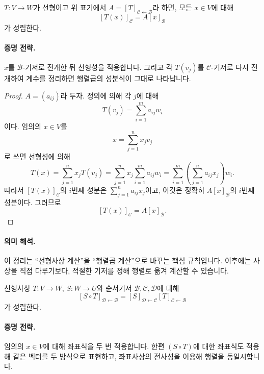 \begin{theorem}[좌표식]
$T:V\to W$가 선형이고 위 표기에서 $A=[T]_{\mathcal C\leftarrow\mathcal B}$라 하면, 모든 $x\in V$에 대해
$$
[T(x)]_{\mathcal C}=A[x]_{\mathcal B}
$$
가 성립한다.
\end{theorem}

\paragraph{증명 전략.}
$x$를 $\mathcal B$-기저로 전개한 뒤 선형성을 적용합니다. 그리고 각 $T(v_j)$를 $\mathcal C$-기저로 다시 전개하여 계수를 정리하면 행렬곱의 성분식이 그대로 나타납니다.

\begin{proof}
$A=(a_{ij})$라 두자. 정의에 의해 각 $j$에 대해
$$
T(v_j)=\sum_{i=1}^m a_{ij}w_i
$$
이다. 임의의 $x\in V$를
$$
x=\sum_{j=1}^n x_j v_j
$$
로 쓰면 선형성에 의해
$$
T(x)=\sum_{j=1}^n x_jT(v_j)
=\sum_{j=1}^n x_j\sum_{i=1}^m a_{ij}w_i
=\sum_{i=1}^m\left(\sum_{j=1}^n a_{ij}x_j\right)w_i.
$$
따라서 $[T(x)]_{\mathcal C}$의 $i$번째 성분은 $\sum_{j=1}^n a_{ij}x_j$이고, 이것은 정확히 $A[x]_{\mathcal B}$의 $i$번째 성분이다. 그러므로
$$
[T(x)]_{\mathcal C}=A[x]_{\mathcal B}.
$$
\end{proof}

\paragraph{의미 해석.}
이 정리는 ``선형사상 계산''을 ``행렬곱 계산''으로 바꾸는 핵심 규칙입니다. 이후에는 사상을 직접 다루기보다, 적절한 기저를 정해 행렬로 옮겨 계산할 수 있습니다.

\begin{theorem}
선형사상 $T:V\to W$, $S:W\to U$와 순서기저 $\mathcal B,\mathcal C,\mathcal D$에 대해
$$
[S\circ T]_{\mathcal D\leftarrow\mathcal B}
=
[S]_{\mathcal D\leftarrow\mathcal C}
[T]_{\mathcal C\leftarrow\mathcal B}
$$
가 성립한다.
\end{theorem}

\paragraph{증명 전략.}
임의의 $x\in V$에 대해 좌표식을 두 번 적용합니다. 한편 $(S\circ T)$에 대한 좌표식도 적용해 같은 벡터를 두 방식으로 표현하고, 좌표사상의 전사성을 이용해 행렬을 동일시합니다.

